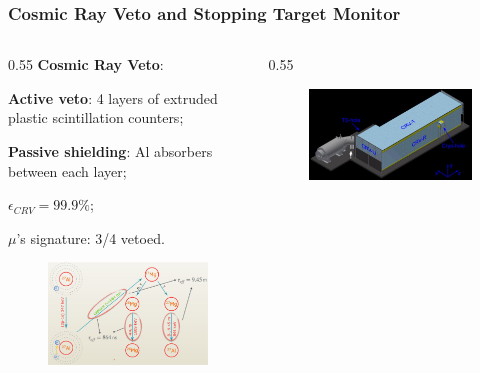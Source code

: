 \documentclass{beamer}
\begin{document}
\begin{frame}
    \frametitle{Cosmic Ray Veto and Stopping Target Monitor}
    \vspace{-2mm}
 \begin{columns}
            \begin{column}{0.55\framewidth}
                     \textbf{Cosmic Ray Veto}:
         \begin{itemize}
        {\small \item \textbf{Active veto}: 4 layers of extruded plastic scintillation counters;
                \item \textbf{Passive shielding}: Al absorbers between each layer;
                \item $\epsilon_{CRV}=99.9\%$;
               \item $\mu$'s signature: 3/4 vetoed.}
            \end{itemize}
             \begin{figure}[h]
            \centering
            \includegraphics[width=0.9\columnwidth]{figures/png/Screenshot_20240706_094517.png}
        \end{figure}
            \end{column}
            \begin{column}{0.55\framewidth}
            \begin{figure}[h]
            \centering
            \includegraphics[width=0.8\columnwidth]{figures/jpg/Crv_downstream.jpg}

\end{figure}
\end{column}
\end{columns}
\end{frame}
\end{document}
